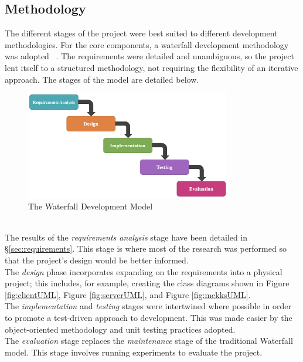 \subsection{Methodology}
\setlength{\leftskip}{0.5cm}
\indent \indent
The different stages of the project were best suited to different development methodologies. For the core components, a waterfall development methodology was adopted ~\cite{Waterfall}. The requirements were detailed and unambiguous, so the project lent itself to a structured methodology, not requiring the flexibility of an iterative approach. The stages of the model are detailed below.
\begin{figure}[ht]
    \centering
    \includegraphics[width=0.8\textwidth]{figures/waterfall.png}
    \caption{The Waterfall Development Model}
    \label{fig:waterfall}
\end{figure}
\\ \indent
The results of the \textit{requirements analysis} stage have been detailed in §\ref{sec:requirements}. This stage is where most of the research was performed so that the project's design would be better informed.
\smallskip \\ \indent
The \textit{design} phase incorporates expanding on the requirements into a physical project; this includes, for example, creating the class diagrams shown in Figure \ref{fig:clientUML}, Figure \ref{fig:serverUML}, and Figure \ref{fig:mekksUML}.
\smallskip \\ \indent
The \textit{implementation} and \textit{testing} stages were intertwined where possible in order to promote a test-driven approach to development. This was made easier by the object-oriented methodology and unit testing practices adopted.
\smallskip \\ \indent
The \textit{evaluation} stage replaces the \textit{maintenance} stage of the traditional Waterfall model. This stage involves running experiments to evaluate the project. 
\smallskip \\ \indent
